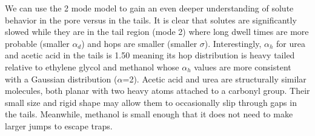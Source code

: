 \documentclass{article}
\begin{document}
  We can use the 2 mode model to gain an even deeper understanding of solute behavior
  in the pore versus in the tails. It is clear that solutes are significantly slowed 
  while they are in the tail region (mode 2) where long dwell times are more probable
  (smaller $\alpha_d$) and hops are smaller (smaller $\sigma$). Interestingly, 
  $\alpha_h$ for urea and acetic acid in the tails is 1.50 meaning its hop distribution
  is heavy tailed relative to ethylene glycol and methanol whose $\alpha_h$ values are
  more consistent with a Gaussian distribution ($\alpha$=2). Acetic acid and urea are
  structurally similar molecules, both planar with two heavy atoms attached to a 
  carbonyl group. Their small size and rigid shape may allow them to occasionally slip
  through gaps in the tails. Meanwhile, methanol is small enough that it does not need
  to make larger jumps to escape traps. 
  

  
\end{document}
